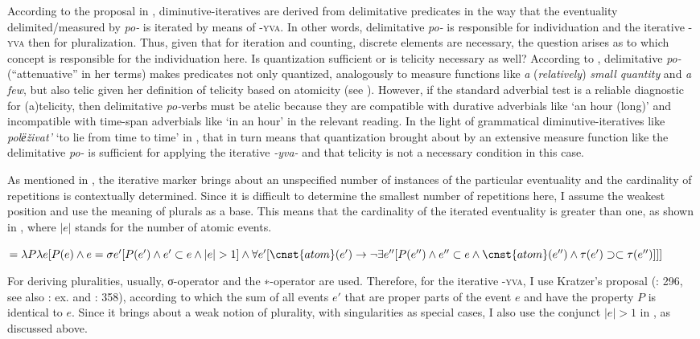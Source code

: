 \documentclass[output=paper,colorlinks,citecolor=brown]{langscibook}
\begin{document}
According to the proposal in , diminutive-iteratives are derived from delimitative predicates in the way that the eventuality delimited/measured by \textit{po-} is iterated by means of \textsc{-yva}. In other words, delimitative \textit{po-} is responsible for individuation and the iterative \textsc{-yva} then for pluralization. Thus, given that for iteration and counting, discrete elements are necessary, the question arises as to which concept is responsible for the individuation here. Is quantization sufficient or is telicity necessary as well? According to \citet[91]{Filip2003}, delimitative \textit{po-} (``attenuative'' in her terms) makes predicates not only quantized, analogously to measure functions like \textit{a} (\textit{relatively}) \textit{small quantity} and \textit{a few}, but also telic given her definition of telicity based on atomicity (see \citealt[60--61]{Filip2003}). However, if the standard adverbial test is a reliable diagnostic for (a)telicity, then delimitative \textit{po-}verbs must be atelic because they are compatible with durative adverbials like ‘an hour (long)’ and incompatible with time-span adverbials like ‘in an hour’ in the relevant reading. In the light of grammatical diminutive-iteratives like \textit{polёživat'} ‘to lie from time to time’ in , that in turn means that quantization brought about by an extensive measure function like the delimitative \textit{po-} is sufficient for applying the iterative \textit{-yva-} and that telicity is not a necessary condition in this case.

As mentioned in , the iterative marker brings about an unspecified number of instances of the particular eventuality and the cardinality of repetitions is contextually determined. Since it is difficult to determine the smallest number of repetitions here, I assume the weakest position and use the meaning of plurals as a base. This means that the cardinality of the iterated eventuality is greater than one, as shown in , where $|e|$ stands for the number of atomic events.

\ea\label{biskup:ex:tricettri} 
 $= \lambda P \lambda e[P(e) \wedge e = \sigma e' [P(e') \wedge e' \subset e \wedge |e| > 1] \wedge \forall e' [\cnst{atom}(e') \rightarrow \neg \exists e''[P(e'') \wedge e'' \subset e \wedge \cnst{atom}(e'') \wedge \tau (e') \supset\subset \tau(e'')]]]$
\z

\noindent For deriving pluralities, usually,  σ-operator and the ∗-operator are used. Therefore, for the iterative \textsc{-yva}, I use Kratzer’s proposal (\citealt{Kratzer2008}: 296, see also \citealt{Boneh.Doron2008}: ex.  and  \citealt{Ferreira2016}: 358), according to which the sum of all events $e'$ that are proper parts of the event $e$ and have the property $P$ is identical to $e$. Since it brings about a weak notion of plurality, with singularities as special cases, I also use the conjunct $|e| > 1$ in , as discussed above.
\end{document}
